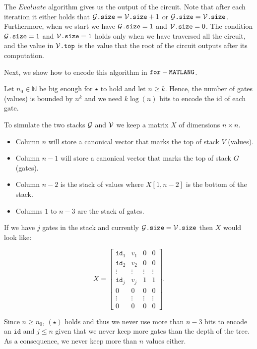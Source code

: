 The $Evaluate$ algorithm gives us the output of the circuit. Note that after each iteration it either holds that $\mathcal{G}\texttt{.size} =  \mathcal{V}\texttt{.size} + 1$ or $\mathcal{G}\texttt{.size} =  \mathcal{V}\texttt{.size}$. Furthermore, when we start we have $\mathcal{G}\texttt{.size}=1$ and $\mathcal{V}\texttt{.size}=0$. The condition $\mathcal{G}\texttt{.size}= 1$ and $\mathcal{V}\texttt{.size}=1$ holds only when we have traversed all the circuit, and the value in $\mathcal{V}\texttt{.top}$ is the value that the root of the circuit outputs after its computation.

Next, we show how to encode this algorithm in $\texttt{for}-\texttt{MATLANG}$.

Let $n_0\in\mathbb{N}$ be big enough for $\star$ to hold and let $n\geq k$. Hence, the number of gates (values) is bounded by $n^k$ and we need $k\log (n)$ bits to encode the id of each gate.

To simulate the two stacks $\mathcal{G}$ and $\mathcal{V}$ we keep a matrix $X$ of dimensions $n \times n$.

\begin{itemize}
	\item Column $n$ will store a canonical vector that marks the top of stack $V$ (values).
	\item Column $n-1$ will store a canonical vector that marks the top of stack $G$ (gates).
	\item Column $n-2$ is the stack of values where $X[1, n-2]$ is the bottom of the stack.
	\item Columns $1$ to $n-3$ are the stack of gates.
\end{itemize}

If we have $j$ gates in the stack and currently $\mathcal{G}\texttt{.size}=\mathcal{V}\texttt{.size}$ then $X$ would look like:

\[
X = \begin{bmatrix}
    \texttt{id}_1 & v_1 & 0 & 0 \\
    \texttt{id}_2 & v_2 & 0 & 0 \\
    \vdots & \vdots & \vdots & \vdots \\
    \texttt{id}_j & v_j & 1 & 1 \\
    0 & 0 & 0 & 0 \\
    \vdots & \vdots & \vdots & \vdots \\
     0 & 0 & 0 & 0
\end{bmatrix}.
\]

Since $n\geq n_0$, $(\star)$ holds and thus we never use more than $n-3$ bits to encode an $\texttt{id}$ and $j\leq n$ given that we never keep more gates than the depth of the tree. As a consequence, we never keep more than $n$ values either.

